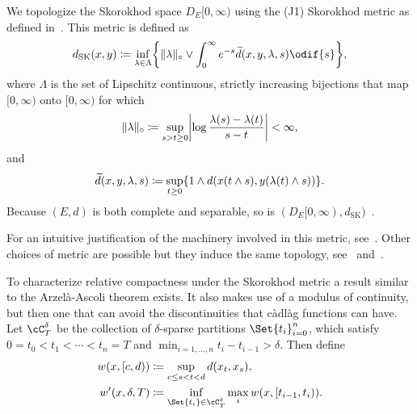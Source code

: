 We topologize the Skorokhod space \(D_E[0,\infty)\) using the (J1) Skorokhod metric as defined in~\cite[pp.116-117]{ethierMarkovProcessesCharacterization1985}.
This metric is defined as
\begin{equation}
  d_\mathrm{SK}(x,y) \coloneqq \inf_{\lambda \in \Lambda} \cbr*{ \norm{\lambda}_\circ \lor \int_0^\infty e^{-s} \widetilde{d}(x,y,\lambda,s) \odif{s} },
\end{equation}
where \( \Lambda \) is the set of Lipschitz continuous, strictly increasing bijections that map \([0,\infty)\) onto \([0,\infty)\) for which
\begin{equation}
  \norm{\lambda}_\circ \coloneqq \sup_{s > t \geq 0} \abs*{ \log \frac{\lambda(s)-\lambda(t)}{s-t} } < \infty,
\end{equation}
and
\begin{equation}
  \widetilde{d}(x,y,\lambda,s) \coloneqq \sup_{t \geq 0} \{ 1 \land d(x(t \land s), y(\lambda(t) \land s)) \}.
\end{equation}
Because \((E, d)\) is both complete and separable, so is \((D_E[0,\infty), d_\mathrm{SK})\)~\cite[Theorem 3.5.6]{ethierMarkovProcessesCharacterization1985}.

For an intuitive justification of the machinery involved in this metric, see~\cite{kernSkorokhodTopologiesWhat2024}.
Other choices of metric are possible but they induce the same topology, see~\cite[pp.166-168]{billingsleyConvergenceProbabilityMeasures1999} and~\cite[p.122-123]{pollardConvergenceStochasticProcesses1984}.

To characterize relative compactness under the Skorokhod metric a result similar to the Arzelà-Ascoli theorem exists.
It also makes use of a modulus of continuity, but then one that can avoid the discontinuities that càdlàg functions can have.
Let \( \cC_T^\delta \) be the collection of \( \delta \)-sparse partitions \(\Set{t_i}_{i=0}^n\), which satisfy \(0 = t_0 < t_1 < \cdots < t_n = T\) and \( \min_{i=1,\dots,n} t_i - t_{i-1} > \delta \).
Then define
\begin{equation}\label{eq:w-w'-def}
  \begin{split}
    w(x, [c,d))      & \coloneqq \sup_{c \leq s < t < d} d(x_t,x_s),                            \\
    w'(x, \delta, T) & \coloneqq \inf_{\Set{t_i} \in \cC_T^\delta} \max_i w(x, [t_{i-1}, t_i)).
  \end{split}
\end{equation}

